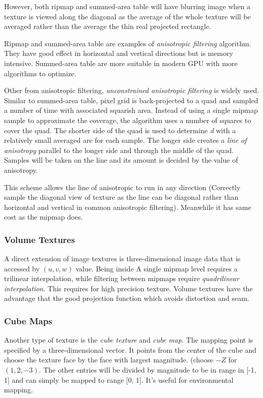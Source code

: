 \documentclass[10pt, a4paper]{article}
\begin{document}
    However, both ripmap and summed-area table will have blurring image when a texture is viewed along the diagonal as the average of the whole texture will be averaged rather than the average the thin real projected rectangle. 

    Ripmap and  summed-area table are examples of \emph{anisotropic filtering} algorithm. They have good effect in horizontal and vertical directions but is memory intensive.  Summed-area table are more suitable in modern GPU with more algorithms to optimize. 

    Other from anisotropic filtering, \emph{unconstrained anisotropic filtering} is widely used. Similar to summed-area table, pixel grid is back-projected to a quad and sampled a number of time with associated squarish area. Instead of using a single mipmap sample to approximate the coverage, the algorithm uses a number of squares to cover the quad. The shorter side of the quad is used to determine \emph{d} with a relatively small averaged are for each sample. The longer side creates a \emph{line of anisotropy} parallel to the longer side and through the middle of the quad. Samples will be taken on the line and its amount is decided by the value of anisotropy. 
    
    This scheme allows the line of anisotropic to run in any direction (Correctly sample the diagonal view of texture as the line can be diagonal rather than horizontal and vertical in common anisotropic filtering). Meanwhile it has same cost as the mipmap does. 
\subsubsection{Volume Textures}
    A direct extension of image textures is three-dimensional image data that is accessed by $(u, v, w)$ value. Being inside A single mipmap level requires a trilinear interpolation, while filtering between mipmaps require \emph{quadrilinear interpolation}. This requires for high precision texture. Volume textures have the advantage that the good projection function which avoids distortion and seam. 
    
\subsubsection{Cube Maps}
    Another type of texture is the \emph{cube texture} and \emph{cube map}. The mapping point is specified by a three-dimensional vector. It points from the center of the cube and choose the texture face by the face with largest magnitude. (choose $-Z$ for $(1, 2, -3)$. The other entries will be divided by magnitude to be in range in [-1, 1] and can simply be mapped to range [0, 1]. It's useful for environmental mapping.
\end{document}
